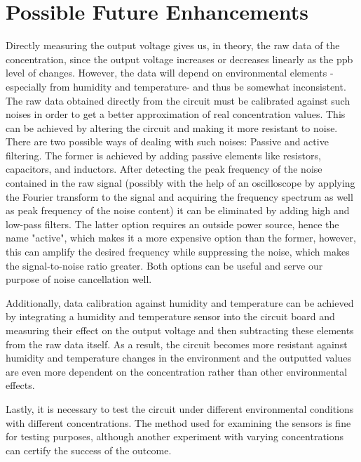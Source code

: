 \section{Possible Future Enhancements}
Directly measuring the output voltage gives us, in theory, the raw data of the  concentration, since the output voltage increases or decreases linearly as the ppb level of  changes. However, the data will depend on environmental elements -especially from humidity and temperature- and thus be somewhat inconsistent. The raw data obtained directly from the circuit must be calibrated against such noises in order to get a better approximation of real concentration values. This can be achieved by altering the circuit and making it more resistant to noise. There are two possible ways of dealing with such noises: Passive and active filtering. The former is achieved by adding passive elements like resistors, capacitors, and inductors. After detecting the peak frequency of the noise contained in the raw signal (possibly with the help of an oscilloscope by applying the Fourier transform to the signal and acquiring the frequency spectrum as well as peak frequency of the noise content) it can be eliminated by adding high and low-pass filters. The latter option requires an outside power source, hence the name "active", which makes it a more expensive option than the former, however, this can amplify the desired frequency while suppressing the noise, which makes the signal-to-noise ratio greater. Both options can be useful and serve our purpose of noise cancellation well.\par 
Additionally, data calibration against humidity and temperature can be achieved by integrating a humidity and temperature sensor into the circuit board and measuring their effect on the output voltage and then subtracting these elements from the raw data itself. As a result, the circuit becomes more resistant against humidity and temperature changes in the environment and the outputted values are even more dependent on the  concentration rather than other environmental effects.\par
Lastly, it is necessary to test the circuit under different environmental conditions with different  concentrations. The method used for examining the sensors is fine for testing purposes, although another experiment with varying  concentrations can certify the success of the outcome.
